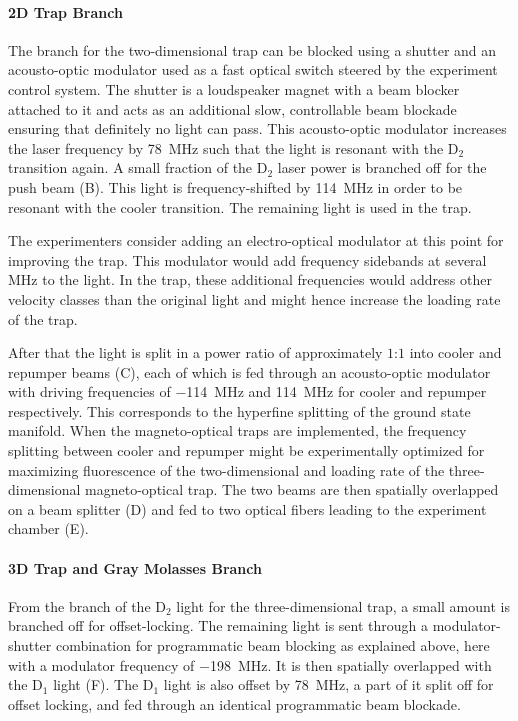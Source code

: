 \paragraph{2D Trap Branch} The branch for the two-dimensional trap can be blocked using a shutter and an acousto-optic modulator used as a fast optical switch steered by the experiment control system. The shutter is a loudspeaker magnet with a beam blocker attached to it and acts as an additional slow, controllable beam blockade ensuring that definitely no light can pass. This acousto-optic modulator increases the laser frequency by \SI{+78}{\mega\hertz} such that the light is resonant with the D$_2$ transition again. A small fraction of the D$_2$ laser power is branched off for the push beam (B). This light is frequency-shifted by \SI{+114}{\mega\hertz} in order to be resonant with the cooler transition. The remaining light is used in the trap.

The experimenters consider adding an electro-optical modulator at this point for improving the trap. This modulator would add frequency sidebands at several \si{\mega\hertz} to the light. In the trap, these additional frequencies would address other velocity classes than the original light and might hence increase the loading rate of the trap.

After that the light is split in a power ratio of approximately $1$:$1$ into cooler and repumper beams (C), each of which is fed through an acousto-optic modulator with driving frequencies of \SI{-114}{\mega\hertz} and \SI{+114}{\mega\hertz} for cooler and repumper respectively. This corresponds to the hyperfine splitting of the ground state manifold. When the magneto-optical traps are implemented, the frequency splitting between cooler and repumper might be experimentally optimized for maximizing fluorescence of the two-dimensional and loading rate of the three-dimensional magneto-optical trap. The two beams are then spatially overlapped on a beam splitter (D) and fed to two optical fibers leading to the experiment chamber (E).

\paragraph{3D Trap and Gray Molasses Branch} From the branch of the D$_2$ light for the three-dimensional trap, a small amount is branched off for offset-locking. The remaining light is sent through a modulator-shutter combination for programmatic beam blocking as explained above, here with a modulator frequency of \SI{-198}{\mega\hertz}. It is then spatially overlapped with the D$_1$ light (F). The D$_1$ light is also offset by \SI{+78}{\mega\hertz}, a part of it split off for offset locking, and fed through an identical programmatic beam blockade.

